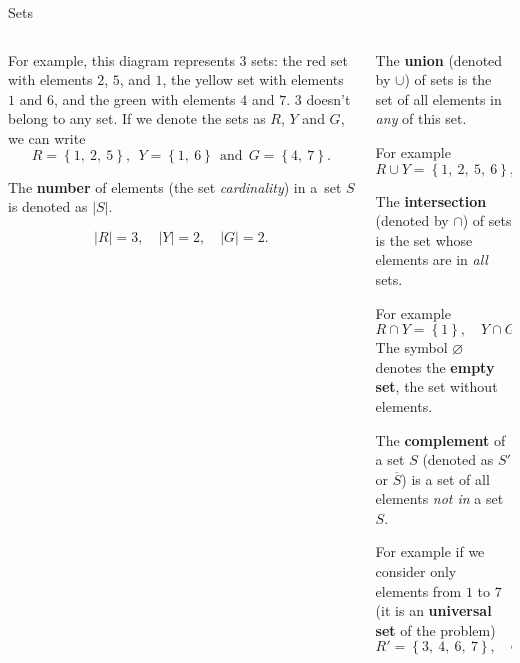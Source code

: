 \documentclass[9pt,aspectratio=169]{beamer}
\begin{document}
\begin{frame}{Sets}
\begin{columns}[T]
\begin{column}{0.5\textwidth}
      For example, this diagram represents $3$ sets: the red set with elements $2$, $5$, and $1$, the yellow set with elements $1$ and $6$, and the green with elements $4$ and $7$. $3$ doesn't belong to any set. If we denote the sets as $R$, $Y$ and $G$, we can write
      \[ R = \left\{1,\ 2,\ 5\right\},\ \  Y = \left\{1,\ 6\right\}\ \ \text{and}\ \ G = \left\{4,\ 7\right\}. \]
      \vspace*{-0.9\baselineskip}
      \begin{definition}
        The \textbf{number} of elements (the set \emph{cardinality}) in a~set $S$ is denoted as $|S|$.
      \end{definition}
      \vspace*{-1\baselineskip}
      \[|R| = 3,\quad  |Y| = 2,\quad  |G| = 2.\]
    \end{column}
    \begin{column}{0.5\textwidth}
      \begin{definition}
        The \textbf{union} (denoted by $\cup$) of sets is the set of all elements in \emph{any} of this set.
      \end{definition}
      For example
      \[ R \cup Y = \left\{1,\ 2,\ 5,\ 6\right\},\quad  Y \cup G = \left\{1,\ 4,\ 6,\ 7\right\}. \]
      \vspace*{-0.9\baselineskip}
      \begin{definition}
        The \textbf{intersection} (denoted by $\cap$) of sets is the set whose elements are in \emph{all} sets.
      \end{definition}
      For example
      \[ R \cap Y = \left\{1\right\},\quad  Y \cap G = \left\{\ \right\} = \varnothing. \] 
      The symbol $\varnothing$ denotes the \textbf{empty set}, the set without elements.
      \begin{definition}
        \vspace*{-0.3em}
        The \textbf{complement} of a set $S$ (denoted as $S'$ or $\overline{S}$) is a set of all elements \emph{not in} a set $S$.
      \end{definition}
      For example if we consider only elements from $1$ to $7$ (it is an \textbf{universal set} of the problem)
      \[ R′ = \left\{3,\ 4,\ 6,\ 7\right\},\quad  G′ = \left\{1,\ 2,\ 3,\ 5,\ 6\right\}. \]
    \end{column}
  \end{columns}
\end{frame}
\end{document}
